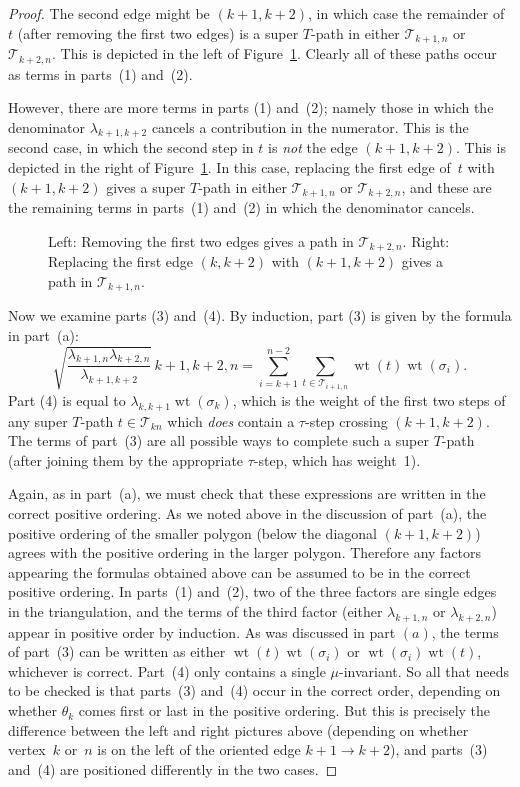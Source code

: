 \documentclass[pdftex]{sigma}
\numberwithin{equation}{section}
\DeclareMathOperator{\wt}{wt}
\begin{document}
\begin{proof}
 The second edge might be $(k+1,k+2)$, in which case the remainder of $t$ (after removing the first two edges) is a super $T$-path
 in either $\mathcal{T}_{k+1,n}$ or $\mathcal{T}_{k+2,n}$. This is depicted in the left of Figure~\ref{fig:zigzag_cases}.
 Clearly all of these paths occur as terms in parts~(1) and~(2).

 However, there are more terms in parts (1) and~(2);
 namely those in which the denominator $\lambda_{k+1,k+2}$ cancels a contribution in the numerator. This is the
 second case, in which the second step in $t$ is \emph{not} the edge $(k+1,k+2)$. This is depicted in the right of Figure~\ref{fig:zigzag_cases}.
 In this case, replacing the first edge of~$t$ with $(k+1,k+2)$ gives
 a super $T$-path in either $\mathcal{T}_{k+1,n}$ or $\mathcal{T}_{k+2,n}$, and these are the remaining terms in parts~(1) and~(2) in which the denominator cancels.

 \begin{figure}[h]\centering
 
 \caption{{Left:} Removing the first two edges gives a path in $\mathcal{T}_{k+2,n}$.
 {Right:} Replacing the first edge $(k,k+2)$ with $(k+1,k+2)$ gives a path in $\mathcal{T}_{k+1,n}$.} \label{fig:zigzag_cases}
 \end{figure}

 Now we examine parts (3) and~(4). By induction, part (3) is given by the formula in part~(a):
 \[
 \sqrt{\frac{\lambda_{k+1,n} \lambda_{k+2,n}}{\lambda_{k+1,k+2}}}\, \boxed{k+1,k+2,n}
 = \sum_{i=k+1}^{n-2} \sum_{t \in \mathcal{T}_{i+1,n}} \wt(t) \wt(\sigma_i).
 \]
 Part (4) is equal to $\lambda_{k,k+1} \wt(\sigma_k)$, which is the weight of the first two steps of any super $T$-path $t \in \mathcal{T}_{kn}$ which \emph{does}
 contain a $\tau$-step crossing $(k+1,k+2)$. The terms of part~(3) are all possible ways to complete such a super $T$-path (after joining them by
 the appropriate $\tau$-step, which has weight~1).

 Again, as in part~(a), we must check that these expressions are written in the correct positive ordering. As we noted above
 in the discussion of part~(a), the positive ordering of the smaller polygon (below the diagonal $(k+1,k+2)$) agrees with
 the positive ordering in the larger polygon. Therefore any factors appearing the formulas obtained above can be assumed to be in
 the correct positive ordering. In parts~(1) and~(2), two of the three factors are single edges in the triangulation, and the terms of the third factor
 (either $\lambda_{k+1,n}$ or $\lambda_{k+2,n}$) appear in positive order by induction. As was discussed in part $(a)$, the terms of
 part~(3) can be written as either $\wt(t)\wt(\sigma_i)$ or $\wt(\sigma_i)\wt(t)$, whichever is correct. Part~(4) only contains a single $\mu$-invariant.
 So all that needs to be checked is that parts~(3) and~(4) occur in the correct order, depending on whether $\theta_k$ comes first or last
 in the positive ordering. But this is precisely the difference between the left and right pictures above (depending on whether vertex~$k$ or~$n$ is on the left of the oriented edge $k+1 \to k+2$), and parts~(3) and~(4) are positioned differently in the two cases.
\end{proof}
\end{document}
